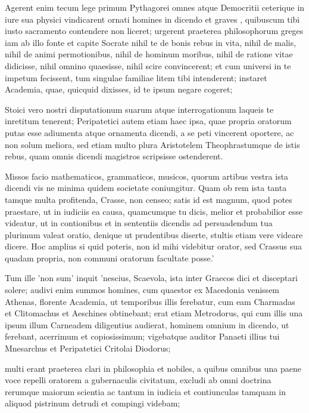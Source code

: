  Agerent enim tecum lege primum Pythagorei omnes atque Democritii ceterique in iure sua physici vindicarent ornati homines in dicendo et graves , quibuscum tibi iusto sacramento contendere non liceret; urgerent praeterea philosophorum greges iam ab illo fonte et capite Socrate nihil te de bonis rebus in vita, nihil de malis, nihil de animi permotionibus, nihil de hominum moribus, nihil de ratione vitae didicisse, nihil omnino quaesisse, nihil scire convincerent; et cum universi in te impetum fecissent, tum singulae familiae litem tibi intenderent; instaret Academia, quae, quicquid dixisses, id te ipsum negare cogeret;

 Stoici vero nostri disputationum suarum atque interrogationum laqueis te inretitum tenerent; Peripatetici autem etiam haec ipsa, quae propria oratorum putas esse adiumenta atque ornamenta dicendi, a se peti vincerent oportere, ac non solum meliora, sed etiam multo plura Aristotelem Theophrastumque de istis rebus, quam omnis dicendi magistros scripsisse ostenderent.

 Missos facio mathematicos, grammaticos, musicos, quorum artibus vestra ista dicendi vis ne minima quidem societate coniungitur. Quam ob rem ista tanta tamque multa profitenda, Crasse, non censeo; satis id est magnum, quod potes praestare, ut in iudiciis ea causa, quamcumque tu dicis, melior et probabilior esse videatur, ut in contionibus et in sententiis dicendis ad persuadendum tua plurimum valeat oratio, denique ut prudentibus diserte, stultis etiam vere videare dicere. Hoc amplius si quid poteris, non id mihi videbitur orator, sed Crassus sua quadam propria, non communi oratorum facultate posse.'

 Tum ille 'non sum' inquit 'nescius, Scaevola, ista inter Graecos dici et disceptari solere; audivi enim summos homines, cum quaestor ex Macedonia venissem Athenas, florente Academia, ut temporibus illis ferebatur, cum eam Charmadas et Clitomachus et Aeschines obtinebant; erat etiam Metrodorus, qui cum illis una ipsum illum Carneadem diligentius audierat, hominem omnium in dicendo, ut ferebant, acerrimum et copiosissimum; vigebatque auditor Panaeti illius tui Mnesarchus et Peripatetici Critolai Diodorus;

 multi erant praeterea clari in philosophia et nobiles, a quibus omnibus una paene voce repelli oratorem a gubernaculis civitatum, excludi ab omni doctrina rerumque maiorum scientia ac tantum in iudicia et contiunculas tamquam in aliquod pistrinum detrudi et compingi videbam;

